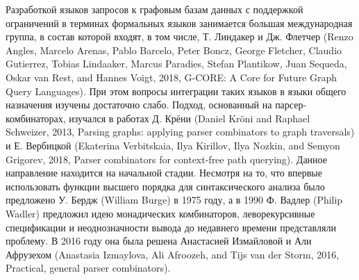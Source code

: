 \documentclass[12pt]{article}  %
\theoremstyle{remark}
\begin{document}
Разработкой языков запросов к графовым базам данных с поддержкой ограничений в терминах формальных языков занимается большая международная группа, в состав которой входят, в том числе, Т. Линдакер и Дж. Флетчер (Renzo Angles, Marcelo Arenas, Pablo Barcelo, Peter Boncz, George Fletcher, Claudio Gutierrez, Tobias Lindaaker, Marcus Paradies, Stefan Plantikow, Juan Sequeda, Oskar van Rest, and Hannes Voigt, 2018, G-CORE: A Core for Future Graph Query Languages). При этом вопросы интеграции таких языков в языки общего назначения изучены достаточно слабо. Подход, основанный на парсер-комбинаторах, изучался в работах Д. Крёни (Daniel Kröni and Raphael Schweizer, 2013, Parsing graphs: applying parser combinators to graph traversals) и Е. Вербицкой (Ekaterina Verbitskaia, Ilya Kirillov, Ilya Nozkin, and Semyon Grigorev, 2018, Parser combinators for context-free path querying). Данное направление находится на начальной стадии. Несмотря на то, что впервые использовать функции высшего порядка для синтаксического анализа было предложено У. Бердж (William Burge) в 1975 году, а в 1990 Ф. Вадлер (Philip Wadler) предложил идею монадических комбинаторов, леворекурсивные спецификации и неоднозначности вывода до недавнего времени представляли проблему. В 2016 году она была решена Анастасией Измайловой и Али Афрузехом (Anastasia Izmaylova, Ali Afroozeh, and Tijs van der Storm, 2016, Practical, general parser combinators).
\end{document}
